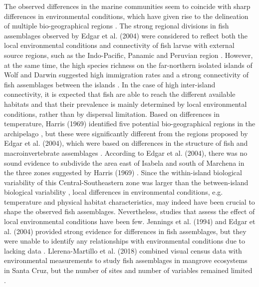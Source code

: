 The observed differences in the marine communities seem to coincide with sharp differences in environmental conditions, which have given rise to the delineation of multiple bio-geographical regions \citep{Harris1969BreedingIslands,Jennings1994TheArchipelago}. The strong regional divisions in fish assemblages observed by Edgar et al. (2004) were considered to reflect both the local environmental conditions and connectivity of fish larvae with external source regions, such as the Indo-Pacific, Panamic and Peruvian region \cite{Edgar2004}. However, at the same time, the high species richness on the far-northern isolated islands of Wolf and Darwin suggested high immigration rates and a strong connectivity of fish assemblages between the islands \citep{Edgar2004}. In the case of high inter-island connectivity, it is expected that fish are able to reach the different available habitats and that their prevalence is mainly determined by local environmental conditions, rather than by dispersal limitation. Based on differences in temperature, Harris (1969) identified five potential bio-geographical regions in the archipelago \cite{Harris1969BreedingIslands}, but these were significantly different from the regions proposed by Edgar et al. (2004), which were based on differences in the structure of fish and macroinvertebrate assemblages \cite{Edgar2004}. According to Edgar et al. (2004), there was no sound evidence to subdivide the area east of Isabela and south of Marchena in the three zones suggested by Harris (1969) \cite{Edgar2004,Harris1969BreedingIslands}. Since the within-island biological variability of this Central-Southeastern zone was larger than the between-island biological variability \citep{Edgar2004}, local differences in environmental conditions, e.g. temperature and physical habitat characteristics, may indeed have been crucial to shape the observed fish assemblages. Nevertheless, studies that assess the effect of local environmental conditions have been few. Jennings et al. (1994) and Edgar et al. (2004) provided strong evidence for differences in fish assemblages, but they were unable to identify any relationships with environmental conditions due to lacking data \cite{Edgar2004,Jennings1994TheArchipelago}. Llerena-Martillo et al. (2018) combined visual census data with environmental measurements to study fish assemblages in mangrove ecosystems in Santa Cruz, but the number of sites and number of variables remained limited \cite{Llerena-Martillo2018FishReserve}.

